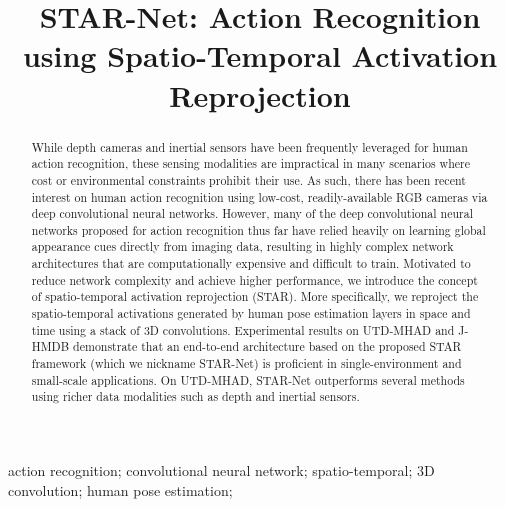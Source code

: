 \documentclass[10pt, conference, compsocconf]{IEEEtran}
\begin{document}
\title{STAR-Net: Action Recognition using Spatio-Temporal Activation Reprojection}




\author{
}













\maketitle

\begin{abstract}
While depth cameras and inertial sensors have been frequently leveraged for human action recognition, these sensing modalities are impractical in many scenarios where cost or environmental constraints prohibit their use.  As such, there has been recent interest on human action recognition using low-cost, readily-available RGB cameras via deep convolutional neural networks. However, many of the deep convolutional neural networks proposed for action recognition thus far have relied heavily on learning global appearance cues directly from imaging data, resulting in highly complex network architectures that are computationally expensive and difficult to train. Motivated to reduce network complexity and achieve higher performance, we introduce the concept of spatio-temporal activation reprojection (STAR). More specifically, we reproject the spatio-temporal activations generated by human pose estimation layers in space and time using a stack of 3D convolutions.  Experimental results on UTD-MHAD and J-HMDB demonstrate that an end-to-end architecture based on the proposed STAR framework (which we nickname STAR-Net) is proficient in single-environment and small-scale applications. On UTD-MHAD, STAR-Net outperforms several methods using richer data modalities such as depth and inertial sensors.

\end{abstract}

\begin{IEEEkeywords}
action recognition; convolutional neural network; spatio-temporal; 3D convolution; human pose estimation; 
\end{IEEEkeywords}
\end{document}
